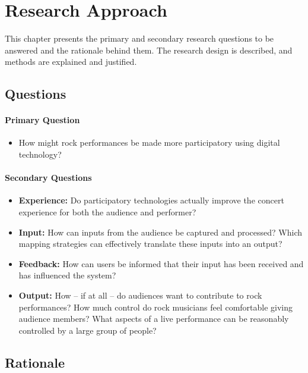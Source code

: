 \chapter{Research Approach}

This chapter presents the primary and secondary research questions to be answered and the rationale behind them. The research design is described, and methods are explained and justified.

\section{Questions}

\subsubsection{Primary Question}

\begin{itemize}
	\item How might rock performances be made more participatory using digital technology?
\end{itemize}

\subsubsection{Secondary Questions}

\begin{itemize}
	\item \textbf{Experience:} Do participatory technologies actually improve the concert experience for both the audience and performer?

	\item \textbf{Input:} How can inputs from the audience be captured and processed? Which mapping strategies can effectively translate these inputs into an output?

	\item \textbf{Feedback:} How can users be informed that their input has been received and has influenced the system?

	\item \textbf{Output:} How -- if at all -- do audiences want to contribute to rock performances? How much control do rock musicians feel comfortable giving audience members? What aspects of a live performance can be reasonably controlled by a large group of people?
\end{itemize}


\section{Rationale}

